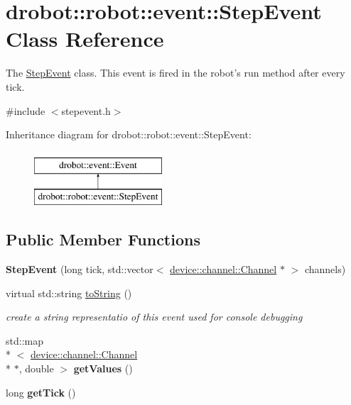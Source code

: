 \hypertarget{classdrobot_1_1robot_1_1event_1_1StepEvent}{\section{drobot\-:\-:robot\-:\-:event\-:\-:Step\-Event Class Reference}
\label{classdrobot_1_1robot_1_1event_1_1StepEvent}
}


The \hyperlink{classdrobot_1_1robot_1_1event_1_1StepEvent}{Step\-Event} class. This event is fired in the robot's run method after every tick.  




{\ttfamily \#include $<$stepevent.\-h$>$}

Inheritance diagram for drobot\-:\-:robot\-:\-:event\-:\-:Step\-Event\-:\begin{figure}[H]
\begin{center}
\leavevmode
\includegraphics[height=2.000000cm]{classdrobot_1_1robot_1_1event_1_1StepEvent}
\end{center}
\end{figure}
\subsection*{Public Member Functions}
\begin{DoxyCompactItemize}
\item 
\hypertarget{classdrobot_1_1robot_1_1event_1_1StepEvent_a5e69bc4f78a26d9840e703b62d276bd2}{{\bfseries Step\-Event} (long tick, std\-::vector$<$ \hyperlink{classdrobot_1_1device_1_1channel_1_1Channel}{device\-::channel\-::\-Channel} $\ast$ $>$ channels)}\label{classdrobot_1_1robot_1_1event_1_1StepEvent_a5e69bc4f78a26d9840e703b62d276bd2}

\item 
virtual std\-::string \hyperlink{classdrobot_1_1robot_1_1event_1_1StepEvent_a40504ba9d43d9db0efdd7a16551af2f3}{to\-String} ()
\begin{DoxyCompactList}\small\item\em create a string representatio of this event used for console debugging \end{DoxyCompactList}\item 
\hypertarget{classdrobot_1_1robot_1_1event_1_1StepEvent_ad2d67f93de9315243b3dc32f49df1105}{std\-::map\\*
$<$ \hyperlink{classdrobot_1_1device_1_1channel_1_1Channel}{device\-::channel\-::\-Channel} \\*
$\ast$, double $>$ {\bfseries get\-Values} ()}\label{classdrobot_1_1robot_1_1event_1_1StepEvent_ad2d67f93de9315243b3dc32f49df1105}

\item 
\hypertarget{classdrobot_1_1robot_1_1event_1_1StepEvent_a538142a106678318cdcc4639f62bcdf4}{long {\bfseries get\-Tick} ()}\label{classdrobot_1_1robot_1_1event_1_1StepEvent_a538142a106678318cdcc4639f62bcdf4}

\end{DoxyCompactItemize}
